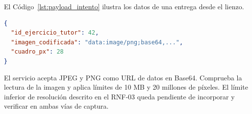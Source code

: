 El Código~\ref{lst:payload_intento} ilustra los datos de una entrega desde el lienzo.

\begin{lstlisting}[language=JSON, caption={Solicitud de registro de un intento desde el lienzo}, label={lst:payload_intento}]
{
  "id_ejercicio_tutor": 42,
  "imagen_codificada": "data:image/png;base64,...",
  "cuadro_px": 28
}
\end{lstlisting}

El servicio acepta JPEG y PNG como URL de datos en Base64. Comprueba la lectura de la imagen y aplica límites de 10 MB y 20 millones de píxeles. El límite inferior de resolución descrito en el RNF-03 queda pendiente de incorporar y verificar en ambas vías de captura.
